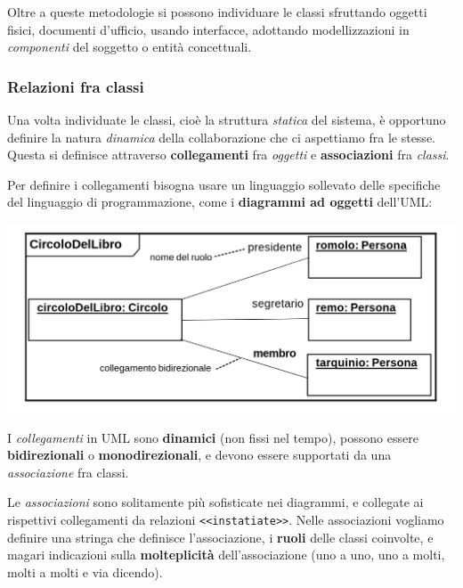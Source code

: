 \documentclass[a4paper,11pt]{article}
\begin{document}
Oltre a queste metodologie si possono individuare le classi sfruttando oggetti fisici, documenti d'ufficio, usando interfacce, adottando modellizzazioni in \textit{componenti} del soggetto o entità concettuali.

\subsubsection{Relazioni fra classi}
Una volta individuate le classi, cioè la struttura \textit{statica} del sistema, è opportuno definire la natura \textit{dinamica} della collaborazione che ci aspettiamo fra le stesse.
Questa si definisce attraverso \textbf{collegamenti} fra \textit{oggetti} e \textbf{associazioni} fra \textit{classi}.

Per definire i collegamenti bisogna usare un linguaggio sollevato delle specifiche del linguaggio di programmazione, come i \textbf{diagrammi ad oggetti} dell'UML:
\begin{center}
	\includegraphics[scale=0.3]{../figures/diag_oggetti.png}
\end{center}

I \textit{collegamenti} in UML sono \textbf{dinamici} (non fissi nel tempo), possono essere \textbf{bidirezionali} o \textbf{monodirezionali}, e devono essere supportati da una \textit{associazione} fra classi.

Le \textit{associazioni} sono solitamente più sofisticate nei diagrammi, e collegate ai rispettivi collegamenti da relazioni \lstinline|<<instatiate>>|. Nelle associazioni vogliamo definire una stringa che definisce l'associazione, i \textbf{ruoli} delle classi coinvolte, e magari indicazioni sulla \textbf{molteplicità} dell'associazione (uno a uno, uno a molti, molti a molti e via dicendo).
\end{document}
